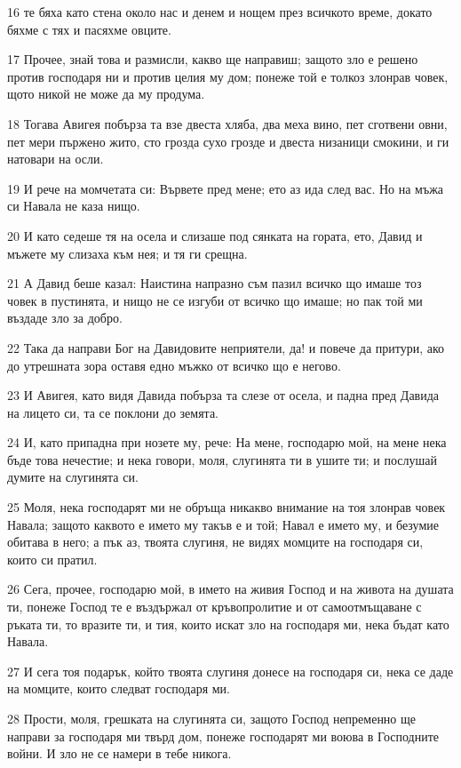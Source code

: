 \par 16 те бяха като стена около нас и денем и нощем през всичкото време, докато бяхме с тях и пасяхме овците.
\par 17 Прочее, знай това и размисли, какво ще направиш; защото зло е решено против господаря ни и против целия му дом; понеже той е толкоз злонрав човек, щото никой не може да му продума.
\par 18 Тогава Авигея побърза та взе двеста хляба, два меха вино, пет сготвени овни, пет мери пържено жито, сто грозда сухо грозде и двеста низаници смокини, и ги натовари на осли.
\par 19 И рече на момчетата си: Вървете пред мене; ето аз ида след вас. Но на мъжа си Навала не каза нищо.
\par 20 И като седеше тя на осела и слизаше под сянката на гората, ето, Давид и мъжете му слизаха към нея; и тя ги срещна.
\par 21 А Давид беше казал: Наистина напразно съм пазил всичко що имаше тоз човек в пустинята, и нищо не се изгуби от всичко що имаше; но пак той ми въздаде зло за добро.
\par 22 Така да направи Бог на Давидовите неприятели, да! и повече да притури, ако до утрешната зора оставя едно мъжко от всичко що е негово.
\par 23 И Авигея, като видя Давида побърза та слезе от осела, и падна пред Давида на лицето си, та се поклони до земята.
\par 24 И, като припадна при нозете му, рече: На мене, господарю мой, на мене нека бъде това нечестие; и нека говори, моля, слугинята ти в ушите ти; и послушай думите на слугинята си.
\par 25 Моля, нека господарят ми не обръща никакво внимание на тоя злонрав човек Навала; защото каквото е името му такъв е и той; Навал е името му, и безумие обитава в него; а пък аз, твоята слугиня, не видях момците на господаря си, които си пратил.
\par 26 Сега, прочее, господарю мой, в името на живия Господ и на живота на душата ти, понеже Господ те е въздържал от кръвопролитие и от самоотмъщаване с ръката ти, то вразите ти, и тия, които искат зло на господаря ми, нека бъдат като Навала.
\par 27 И сега тоя подарък, който твоята слугиня донесе на господаря си, нека се даде на момците, които следват господаря ми.
\par 28 Прости, моля, грешката на слугинята си, защото Господ непременно ще направи за господаря ми твърд дом, понеже господарят ми воюва в Господните войни. И зло не се намери в тебе никога.
